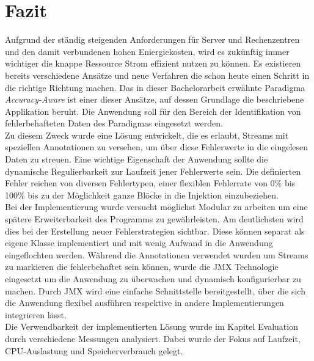 \chapter{Fazit}\vspace{1cm}


Aufgrund der st\"andig steigenden Anforderungen f\"ur Server und Rechenzentren und den damit verbundenen hohen Eniergiekosten, wird es zuk\"unftig immer wichtiger die knappe Ressource Strom effizient nutzen zu k\"onnen. Es existieren bereits verschiedene Ans\"atze und neue Verfahren die schon heute einen Schritt in die richtige Richtung machen. Das in dieser Bachelorarbeit erw\"ahnte Paradigma \textit{Accuracy-Aware} ist einer dieser Ans\"atze, auf dessen Grundlage die beschriebene Applikation beruht. Die Anwendung soll f\"ur den Bereich der Identifikation von fehlerbehafteten Daten des Paradigmas eingesetzt werden.\\
Zu diesem Zweck wurde eine Lösung entwickelt, die es erlaubt, Streams mit speziellen Annotationen zu versehen, um \"uber diese Fehlerwerte in die eingelesen Daten zu streuen. Eine wichtige Eigenschaft der Anwendung sollte die dynamische Regulierbarkeit zur Laufzeit jener Fehlerwerte sein. Die definierten Fehler reichen von diversen Fehlertypen, einer flexiblen Fehlerrate von 0\% bis 100\% bis zu der M\"oglichkeit ganze Bl\"ocke in die Injektion einzubeziehen. \\
Bei der Implementierung wurde versucht m\"oglichst Modular zu arbeiten um eine sp\"atere Erweiterbarkeit des Programms zu gew\"ahrleisten. Am deutlichsten wird dies bei der Erstellung neuer Fehlerstrategien sichtbar. Diese k\"onnen separat als eigene Klasse implementiert und mit wenig Aufwand in die Anwendung eingeflochten werden. W\"ahrend die Annotationen verwendet wurden um Streams zu markieren die fehlerbehaftet sein können, wurde die JMX Technologie eingesetzt um die Anwendung zu überwachen und dynamisch konfigurierbar zu machen. Durch JMX wird eine einfache Schnittstelle bereitgestellt, \"uber die sich die Anwendung flexibel ausf\"uhren respektive in andere Implementierungen integrieren l\"asst.\\
Die Verwendbarkeit der implementierten L\"osung wurde im Kapitel Evaluation durch verschiedene Messungen analysiert. Dabei wurde der Fokus auf Laufzeit, CPU-Auslastung und Speicherverbrauch gelegt.